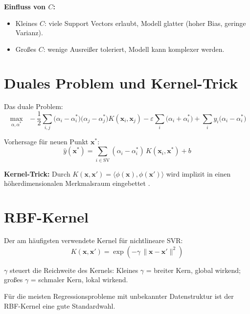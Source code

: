 \documentclass[11pt,a4paper]{report}
\begin{document}
\textbf{Einfluss von $C$:}
\begin{itemize}
\item Kleines $C$: viele Support Vectors erlaubt, Modell glatter (hoher Bias, geringe Varianz).
\item Gro\ss{}es $C$: wenige Ausrei\ss{}er toleriert, Modell kann komplexer werden.
\end{itemize}

\section{Duales Problem und Kernel-Trick}

Das duale Problem:
\begin{equation}
\max_{\alpha, \alpha^*} \;\;
-\frac{1}{2}\sum_{i,j}\bigl(\alpha_i-\alpha_i^*\bigr)\bigl(\alpha_j-\alpha_j^*\bigr)
K(\mathbf{x}_i,\mathbf{x}_j)
-\varepsilon\sum_i\bigl(\alpha_i+\alpha_i^*\bigr)
+\sum_i y_i\bigl(\alpha_i-\alpha_i^*\bigr)
\end{equation}

Vorhersage f\"{u}r neuen Punkt $\mathbf{x}^*$:
\begin{equation}
\hat{y}(\mathbf{x}^*) = \sum_{i\in\text{SV}} (\alpha_i - \alpha_i^*)\,K(\mathbf{x}_i, \mathbf{x}^*) + b
\end{equation}

\textbf{Kernel-Trick:} Durch $K(\mathbf{x}, \mathbf{x}') = \langle\phi(\mathbf{x}), \phi(\mathbf{x}')\rangle$
wird implizit in einen h\"{o}herdimensionalen Merkmalsraum eingebettet \cite{scholkopf2002}.

\section{RBF-Kernel}

Der am h\"{a}ufigsten verwendete Kernel f\"{u}r nichtlineare SVR:
\begin{equation}
K(\mathbf{x}, \mathbf{x}') = \exp\!\left(-\gamma\,\lVert\mathbf{x} - \mathbf{x}'\rVert^2\right)
\label{eq:rbf_kernel}
\end{equation}

$\gamma$ steuert die Reichweite des Kernels: Kleines $\gamma$ = breiter Kern, global wirkend;
gro\ss{}es $\gamma$ = schmaler Kern, lokal wirkend.

\begin{hinweisbox}
F\"{u}r die meisten Regressionsprobleme mit unbekannter Datenstruktur ist der RBF-Kernel eine
gute Standardwahl.
\end{hinweisbox}
\end{document}
